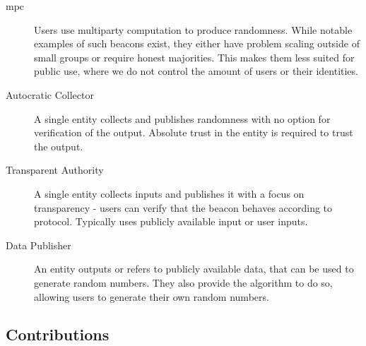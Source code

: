 \begin{description}
    \item [\gls{mpc}] Users use multiparty computation to produce randomness. While notable examples of such beacons exist, they either have problem scaling outside of small groups or require honest majorities. This makes them less suited for public use, where we do not control the amount of users or their identities.
    \item [Autocratic Collector] A single entity collects and publishes randomness with no option for verification of the output. Absolute trust in the entity is required to trust the output.
    \item [Transparent Authority] A single entity collects inputs and publishes it with a focus on transparency - users can verify that the beacon behaves according to protocol. Typically uses publicly available input or user inputs.
    \item [Data Publisher] An entity outputs or refers to publicly available data, that can be used to generate random numbers. They also provide the algorithm to do so, allowing users to generate their own random numbers.
\end{description}




\subsection{Contributions}


